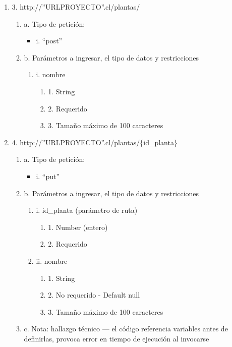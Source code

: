 \begin{enumerate}
    \item 3. http://”URLPROYECTO”.cl/plantas/
    \begin{enumerate}
        \item a. Tipo de petición:
            \begin{itemize}
               \item i. “post”
            \end{itemize}
        \item b. Parámetros a ingresar, el tipo de datos y restricciones
            \begin{enumerate}
                \item i. nombre
                    \begin{enumerate}
                        \item 1. String
                        \item 2. Requerido
                        \item 3. Tamaño máximo de 100 caracteres
                    \end{enumerate}
            \end{enumerate}
    \end{enumerate}

    \item 4. http://”URLPROYECTO”.cl/plantas/\{id\_planta\}
    \begin{enumerate}
        \item a. Tipo de petición:
            \begin{itemize}
               \item i. “put”
            \end{itemize}
        \item b. Parámetros a ingresar, el tipo de datos y restricciones
            \begin{enumerate}
                \item i. id\_planta (parámetro de ruta)
                    \begin{enumerate}
                        \item 1. Number (entero)
                        \item 2. Requerido
                    \end{enumerate}
                \item ii. nombre
                    \begin{enumerate}
                        \item 1. String
                        \item 2. No requerido - Default null
                        \item 3. Tamaño máximo de 100 caracteres
                    \end{enumerate}
            \end{enumerate}
        \item c. Nota: hallazgo técnico — el código referencia variables antes de definirlas, provoca error en tiempo de ejecución al invocarse
    \end{enumerate}


\end{enumerate}
